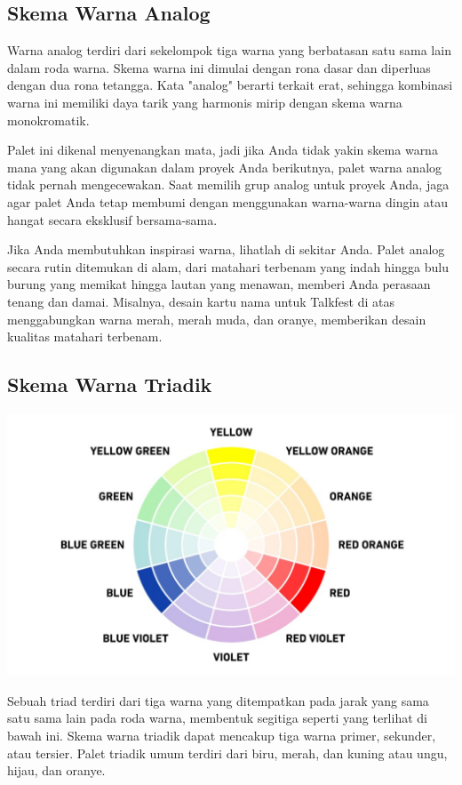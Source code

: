 \documentclass[a4paper]{article}
\begin{document}
\subsection{Skema Warna Analog}
Warna analog terdiri dari sekelompok tiga warna yang berbatasan satu sama lain dalam roda warna. Skema warna ini dimulai dengan rona dasar dan diperluas dengan dua rona tetangga. Kata "analog" berarti terkait erat, sehingga kombinasi warna ini memiliki daya tarik yang harmonis mirip dengan skema warna monokromatik.

Palet ini dikenal menyenangkan mata, jadi jika Anda tidak yakin skema warna mana yang akan digunakan dalam proyek Anda berikutnya, palet warna analog tidak pernah mengecewakan. Saat memilih grup analog untuk proyek Anda, jaga agar palet Anda tetap membumi dengan menggunakan warna-warna dingin atau hangat secara eksklusif bersama-sama.

Jika Anda membutuhkan inspirasi warna, lihatlah di sekitar Anda. Palet analog secara rutin ditemukan di alam, dari matahari terbenam yang indah hingga bulu burung yang memikat hingga lautan yang menawan, memberi Anda perasaan tenang dan damai. Misalnya, desain kartu nama untuk Talkfest di atas menggabungkan warna merah, merah muda, dan oranye, memberikan desain kualitas matahari terbenam.

\subsection{Skema Warna Triadik}
\begin{center}
  \includegraphics[width=\textwidth]{resources/triadic.jpg}
\end{center}
Sebuah triad terdiri dari tiga warna yang ditempatkan pada jarak yang sama satu sama lain pada roda warna, membentuk segitiga seperti yang terlihat di bawah ini. Skema warna triadik dapat mencakup tiga warna primer, sekunder, atau tersier. Palet triadik umum terdiri dari biru, merah, dan kuning atau ungu, hijau, dan oranye.
\end{document}
